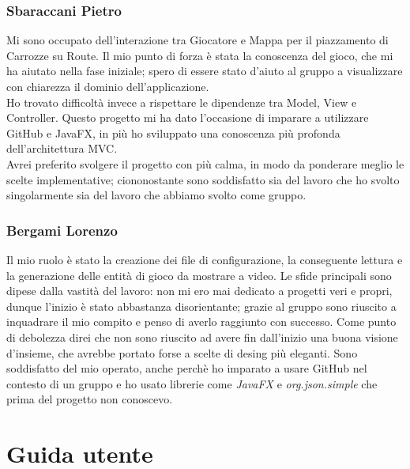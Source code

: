 \documentclass[a4paper,12pt]{report}
\begin{document}
\subsection{Sbaraccani Pietro}
Mi sono occupato dell'interazione tra Giocatore e Mappa per il piazzamento di Carrozze su Route.
Il mio punto di forza è stata la conoscenza del gioco, che mi ha aiutato nella fase iniziale; spero di essere stato d'aiuto al gruppo a visualizzare con chiarezza il dominio dell'applicazione.\\
Ho trovato difficoltà invece a rispettare le dipendenze tra Model, View e Controller.
Questo progetto mi ha dato l'occasione di imparare a utilizzare GitHub e JavaFX, in più ho sviluppato una conoscenza più profonda dell'architettura MVC.\\
Avrei preferito svolgere il progetto con più calma, in modo da ponderare meglio le scelte implementative; ciononostante sono soddisfatto sia del lavoro che ho svolto singolarmente sia del lavoro che abbiamo svolto come gruppo.
\subsection{Bergami Lorenzo}
Il mio ruolo è stato la creazione dei file di configurazione, la conseguente lettura e la generazione delle entità di gioco da mostrare a video.
Le sfide principali sono dipese dalla vastità del lavoro: non mi ero mai dedicato a progetti veri e propri, dunque l'inizio è stato abbastanza disorientante; grazie al gruppo sono riuscito a inquadrare il mio compito e penso di averlo raggiunto con successo. Come punto di debolezza direi che non sono riuscito ad avere fin dall'inizio una buona visione d'insieme, che avrebbe portato forse a scelte di desing più eleganti.
 Sono soddisfatto del mio operato, anche perchè ho imparato a usare GitHub nel contesto di un gruppo e ho usato librerie come \textit{JavaFX} e \textit{org.json.simple} che prima del progetto non conoscevo.
\newpage

\appendix
\chapter{Guida utente}
\end{document}

